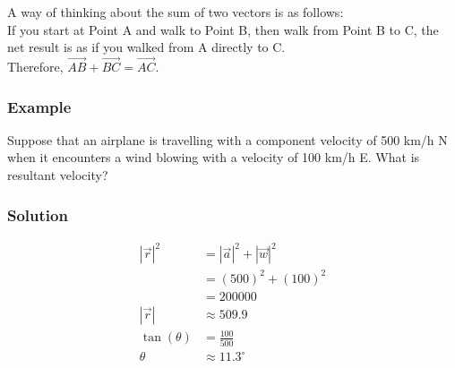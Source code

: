 \documentclass{article}
\begin{document}
A way of thinking about the sum of two vectors is as follows:\\

If you start at Point A and walk to Point B, then walk from Point B to C, the net result is as if you walked from A directly to C.\\

Therefore, $\overrightarrow{AB}+\overrightarrow{BC}=\overrightarrow{AC}$.

\subsubsection*{Example}
Suppose that an airplane is travelling with a component velocity of 500 km/h N when it encounters a wind blowing with a velocity of 100 km/h E. What is resultant velocity?

\subsubsection*{Solution}
\begin{minipage}{0.45\textwidth}
    \centering
    \label{fig:my_label}
\end{minipage}%
\begin{minipage}{0.45\textwidth}
    \begin{align*}
        |\vec{r}|^2 &= |\vec{a}|^2 + |\vec{w}|^2 \\
                    &= (500)^2 + (100)^2 \\
                    &= 200000 \\
        |\vec{r}| &\approx 509.9 \\
        \tan (\theta) &= \frac{100}{500} \\
        \theta &\approx 11.3^{\circ}
    \end{align*}
\end{minipage}
\vspace{2em}
\end{document}
